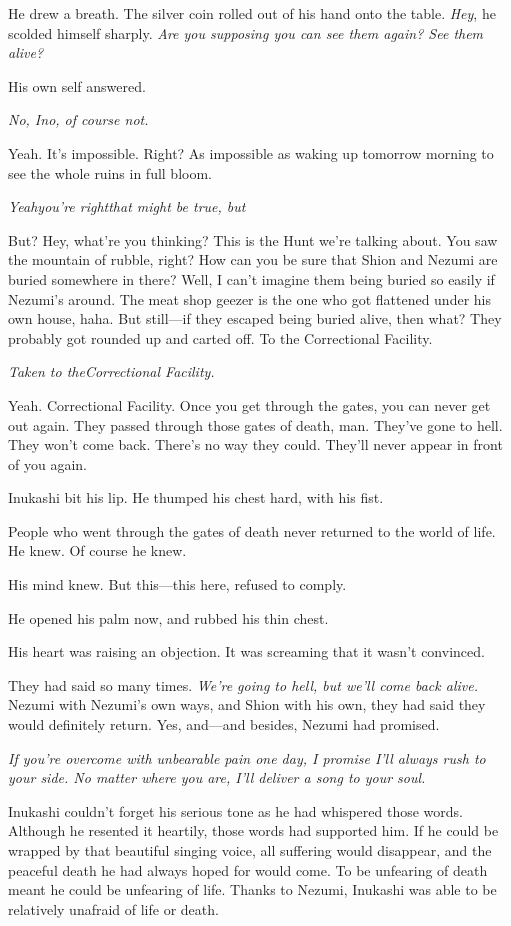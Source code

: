He drew a breath. The silver coin rolled out of his hand onto the table.
\emph{Hey}, he scolded himself sharply. \emph{Are you supposing you can see them
again? See them alive?}

His own self answered.

\emph{No, I\el no, of course not.}

Yeah. It's impossible. Right? As impossible as waking up tomorrow
morning to see the whole ruins in full bloom.

\emph{Yeah\el you're right\el that might be true, but\el }

But? Hey, what're you thinking? This is the Hunt we're talking about.
You saw the mountain of rubble, right? How can you be sure that Shion
and Nezumi are buried somewhere in there? Well, I can't imagine them
being buried so easily if Nezumi's around. The meat shop geezer is the
one who got flattened under his own house, haha. But still---if they
escaped being buried alive, then what? They probably got rounded up and
carted off. To the Correctional Facility.

\emph{Taken to the\el Correctional Facility.}

Yeah. Correctional Facility. Once you get through the gates, you can
never get out again. They passed through those gates of death, man.
They've gone to hell. They won't come back. There's no way they could.
They'll never appear in front of you again.

Inukashi bit his lip. He thumped his chest hard, with his fist.

People who went through the gates of death never returned to the world
of life. He knew. Of course he knew.

His mind knew. But this---this here, refused to comply.

He opened his palm now, and rubbed his thin chest.

His heart was raising an objection. It was screaming that it wasn't
convinced.

They had said so many times. \emph{We're going to hell, but we'll come back
alive.} Nezumi with Nezumi's own ways, and Shion with his own, they had
said they would definitely return. Yes, and---and besides, Nezumi had
promised.

\emph{If you're overcome with unbearable pain one day, I promise I'll always
rush to your side. No matter where you are, I'll deliver a song to your
soul.}

Inukashi couldn't forget his serious tone as he had whispered those
words. Although he resented it heartily, those words had supported him.
If he could be wrapped by that beautiful singing voice, all suffering
would disappear, and the peaceful death he had always hoped for would
come. To be unfearing of death meant he could be unfearing of life.
Thanks to Nezumi, Inukashi was able to be relatively unafraid of life or
death.

